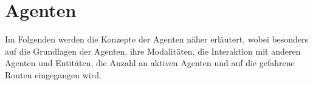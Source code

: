 %


\section{Agenten}\label{sec:agents}

Im Folgenden werden die Konzepte der Agenten näher erläutert, wobei besonders auf die Grundlagen der Agenten, ihre Modalitäten, die Interaktion mit anderen Agenten und Entitäten, die Anzahl an aktiven Agenten und auf die gefahrene Routen eingegangen wird.






